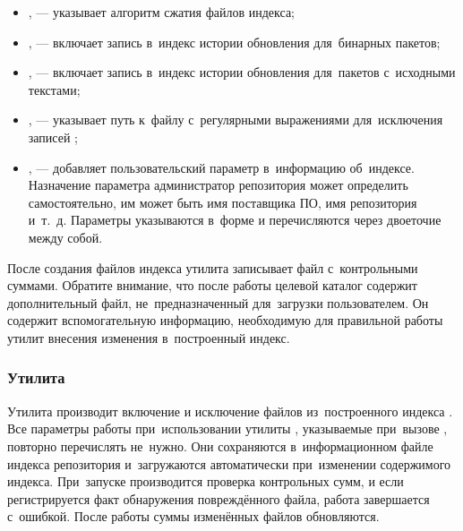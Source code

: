 \begin{itemize}

\item {
,  --- указывает алгоритм сжатия файлов индекса;
}

\item {
,  --- включает запись в~индекс истории обновления для~бинарных пакетов;
}

\item {
,  --- включает запись в~индекс истории обновления для~пакетов с~исходными текстами;
}

\item {
,  --- указывает путь к~файлу с~регулярными выражениями для~исключения записей \requires;
}

\item {
,  --- добавляет пользовательский параметр в~информацию об~индексе.
Назначение параметра администратор репозитория может определить самостоятельно,
им может быть имя поставщика ПО, имя репозитория и~т.~д. 
Параметры указываются в~форме  и перечисляются через двоеточие между собой.
}

\end{itemize}

После создания файлов индекса утилита записывает файл с~контрольными суммами.
Обратите внимание, что после работы целевой каталог содержит дополнительный файл, не~предназначенный для~загрузки пользователем.
Он содержит вспомогательную информацию, необходимую для правильной работы утилит внесения изменения в~построенный индекс.

\subsubsection{Утилита }

Утилита  производит включение и исключение файлов из~построенного индекса \ds.
Все параметры работы при~использовании утилиты , указываемые при~вызове , повторно перечислять не~нужно.
Они сохраняются в~информационном файле индекса репозитория и~загружаются автоматически при~изменении   содержимого индекса.
При~запуске  производится проверка контрольных сумм, и если регистрируется факт обнаружения повреждённого файла, работа завершается с~ошибкой.
После работы суммы изменённых файлов обновляются.

